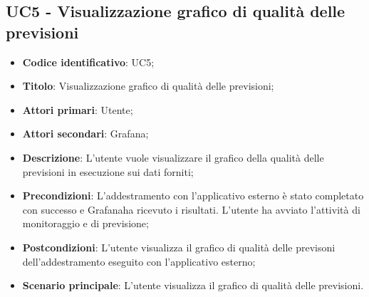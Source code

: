 \subsection{UC5 - Visualizzazione grafico di qualità delle previsioni}
\begin{itemize}
	\item \textbf{Codice identificativo}: UC5;
	\item \textbf{Titolo}: Visualizzazione grafico di qualità delle previsioni;
	\item \textbf{Attori primari}: Utente;
	\item \textbf{Attori secondari}: Grafana\glo;
	\item \textbf{Descrizione}: L'utente vuole visualizzare il grafico della qualità delle previsioni in esecuzione sui dati forniti;
	\item \textbf{Precondizioni}: L'addestramento con l'applicativo esterno è stato completato con successo e Grafana\glosp ha ricevuto i risultati. L'utente ha avviato l'attività di monitoraggio e di previsione;
	\item \textbf{Postcondizioni}: L'utente visualizza il grafico di qualità delle previsoni dell'addestramento eseguito con l'applicativo esterno;
	\item \textbf{Scenario principale}: L'utente visualizza il grafico di qualità delle previsioni.
\end{itemize} 

